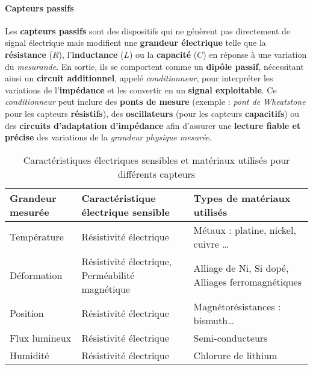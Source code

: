 \paragraph{Capteurs passifs}  
Les \textbf{capteurs passifs} sont des dispositifs qui ne génèrent pas 
directement de signal électrique mais modifient une \textbf{grandeur électrique} 
telle que la \textbf{résistance} (\( R \)), l'\textbf{inductance} (\( L \)) ou 
la \textbf{capacité} (\( C \)) en réponse à une variation du \textit{mesurande}. 
En sortie, ils se comportent comme un \textbf{dipôle passif}, nécessitant ainsi 
un \textbf{circuit additionnel}, appelé \textit{conditionneur}, pour interpréter 
les variations de l'\textbf{impédance} et les convertir en un 
\textbf{signal exploitable}. Ce \textit{conditionneur} peut inclure des 
\textbf{ponts de mesure} (exemple : \textit{pont de Wheatstone} pour les 
capteurs \textbf{résistifs}), des \textbf{oscillateurs} (pour les capteurs 
\textbf{capacitifs}) ou des \textbf{circuits d'adaptation d'impédance} afin 
d'assurer une \textbf{lecture fiable et précise} des variations de la 
\textit{grandeur physique mesurée}.


\begin{table}[h]
    \centering
    \renewcommand{\arraystretch}{1.3}
    \renewcommand\tabularxcolumn[1]{m{#1}}
    \begin{tabularx}{\textwidth}{|>{\centering\arraybackslash}X|>{\raggedright\arraybackslash}X|>{\raggedright\arraybackslash}X|}
        \hline
        \textbf{Grandeur mesurée} & \textbf{Caractéristique électrique sensible} & \textbf{Types de matériaux utilisés} \\
        \hline
        Température & Résistivité électrique & Métaux : platine, nickel, cuivre … \\
        \hline
        Déformation & Résistivité électrique, Perméabilité magnétique & Alliage de Ni, Si dopé, Alliages ferromagnétiques \\
        \hline
        Position & Résistivité électrique & Magnétorésistances : bismuth… \\
        \hline
        Flux lumineux & Résistivité électrique & Semi-conducteurs \\
        \hline
        Humidité & Résistivité électrique & Chlorure de lithium \\
        \hline
    \end{tabularx}
    \caption{Caractéristiques électriques sensibles et matériaux utilisés pour différents capteurs}
    \label{tab:caracteristiques_capteurs}
\end{table}

